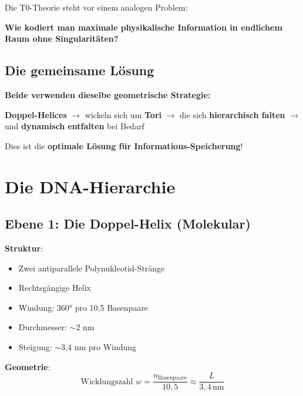 	Die T0-Theorie steht vor einem analogen Problem:
	
	\begin{center}
		
		\textbf{Wie kodiert man maximale physikalische Information in endlichem Raum ohne Singularitäten?}
	\end{center}
	
	\subsection{Die gemeinsame Lösung}
	
	\begin{keyresult}
		\textbf{Beide verwenden dieselbe geometrische Strategie:}
		
		\vspace{0.3cm}
		
		\textbf{Doppel-Helices} $\to$ wickeln sich um \textbf{Tori} $\to$ die sich \textbf{hierarchisch falten} $\to$ und \textbf{dynamisch entfalten} bei Bedarf
		
		\vspace{0.3cm}
		
		Dies ist die \textbf{optimale Lösung für Informations-Speicherung}!
	\end{keyresult}
	
	\section{Die DNA-Hierarchie}
	
	\subsection{Ebene 1: Die Doppel-Helix (Molekular)}
	
	\textbf{Struktur}:
	\begin{itemize}
		\item Zwei antiparallele Polynukleotid-Stränge
		\item Rechtsgängige Helix
		\item Windung: 360° pro 10,5 Basenpaare
		\item Durchmesser: $\sim$2 nm
		\item Steigung: $\sim$3,4 nm pro Windung
	\end{itemize}
	
	\textbf{Geometrie}:
	\begin{equation}
		\text{Wicklungszahl } w = \frac{n_{\text{Basenpaare}}}{10,5} \approx \frac{L}{3,4\,\text{nm}}
	\end{equation}
	
